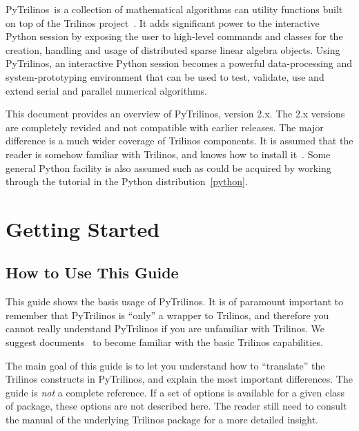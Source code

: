 \documentclass[10pt,relax]{SANDreport}
\newcommand{\PyTrilinos}{{PyTrilinos}}
\begin{document}
\PyTrilinos\ is a collection of mathematical algorithms can utility functions
built on top of the Trilinos project~\cite{Trilinos-home-page}.
It adds significant power to the interactive Python session by exposing the
user to high-level commands and classes for the creation, handling and usage
of distributed sparse linear algebra objects. Using \PyTrilinos, an interactive
Python session becomes a powerful data-processing and system-prototyping
environment that can be used to test, validate, use and extend serial and
parallel numerical algorithms.

This document provides an overview of \PyTrilinos, version 2.x.
The 2.x versions are
completely revided and not compatible with earlier releases. The major
difference is a much wider coverage of Trilinos components.
It
is assumed that the reader is somehow familiar with Trilinos, and knows how to
install it~\cite{Trilinos-tutorial}. 
Some general Python facility is also assumed such as could be
acquired by working through the tutorial in the Python
distribution~\ref{python}. 

\section{Getting Started}
\label{chap:started}

\subsection{How to Use This Guide}
\label{sec:howto}

This guide shows the basis usage of PyTrilinos. It is of paramount important
to remember that PyTrilinos is ``only'' a wrapper to Trilinos, and therefore
you cannot really understand PyTrilinos if you are unfamiliar with Trilinos.
We suggest documents~\cite{Trilinos-tutorial} to become familiar with the
basic Trilinos capabilities.

The main goal of this guide is to let you understand how to ``translate'' the
Trilinos constructs in PyTrilinos, and explain the most important differences.
The guide is {\sl not} a complete reference. If a set of options is available for a given class of package, these options
are not described here. The reader still need to consult the
manual of the underlying Trilinos package for a more detailed insight.
\end{document}
